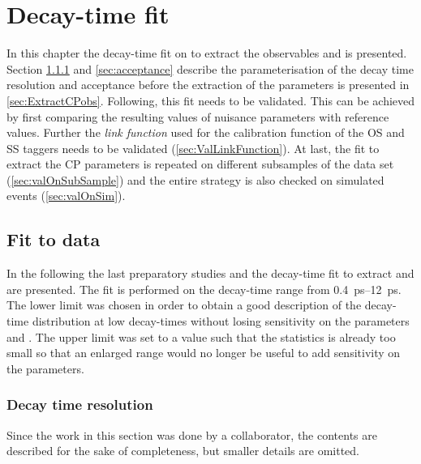 \chapter{Decay-time fit}

\linespread{1.08}\selectfont
In this chapter the decay-time fit on \BdToDpi to extract the \CP observables \Sf and \Sfbar is presented.
Section \ref{sec:resolution} and \ref{sec:acceptance} describe the parameterisation of the decay time resolution and acceptance before the extraction of the \CP parameters is presented in \cref{sec:ExtractCPobs}.
Following, this fit needs to be validated.
This can be achieved by first comparing the resulting values of nuisance parameters with reference values.
Further the \emph{link function} used for the calibration function of the OS and SS taggers needs to be validated (\cref{sec:ValLinkFunction}).
At last, the fit to extract the CP parameters is repeated on different subsamples of the data set (\cref{sec:valOnSubSample}) and the entire strategy is also checked on simulated events (\cref{sec:valOnSim}).

\section{Fit to data}

In the following the last preparatory studies and the decay-time fit to extract \Sf and \Sfbar are presented.
The fit is performed on the decay-time range from \SIrange{0.4}{12}{\pico\second}.
The lower limit was chosen in order to obtain a good description of the decay-time distribution at low decay-times without losing sensitivity on the parameters \Sf and \Sfbar.
The upper limit was set to a value such that the statistics is already too small so that an enlarged range would no longer be useful to add sensitivity on the \CP parameters.

\subsection{Decay time resolution}
\label{sec:resolution}

Since the work in this section was done by a collaborator, the contents are described for the sake of completeness, but smaller details are omitted.

